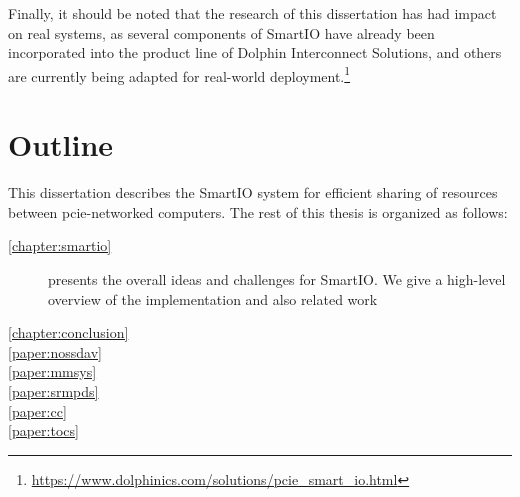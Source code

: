 %
Finally, it should be noted that the research of this dissertation has had impact on real systems, as several components of SmartIO have already been incorporated into the product line of Dolphin Interconnect Solutions, and others are currently being adapted for real-world deployment.\footnote{{\url{https://www.dolphinics.com/solutions/pcie_smart_io.html}}}


\section{Outline}
This dissertation describes the SmartIO system for efficient sharing of resources between \gls{pcie}-networked computers.
%
The rest of this thesis is organized as follows:
\begin{description}
    \item[\cref{chapter:smartio}]
        presents the overall ideas and challenges for SmartIO. 
        We give a high-level overview of the implementation and 
        also related work

    \item[\cref{chapter:conclusion}]

    \item[\cref{paper:nossdav}]

    \item[\cref{paper:mmsys}]

    \item[\cref{paper:srmpds}]

    \item[\cref{paper:cc}]

    \item[\cref{paper:tocs}]
\end{description}

